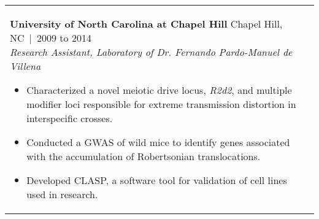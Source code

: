\documentclass[11pt,letter,sans]{moderncv}
\makeatletter
\newenvironment{entrylistFive}{%
  \begin{longtable}{@{\extracolsep{\fill}}ll}
}{%
  \end{longtable}
}
\newcommand{\entryFive}[5]{%
  \parbox[t]{170mm}{%
    \textbf{#2}%
    \hfill%
    {\footnotesize #3~|~#1}\\%
	\emph{#4}\\%
    #5\vspace{\parsep}%
  }\\}
\makeatother
\begin{document}
\begin{entrylistFive}
\entryFive
{2009 to 2014}
{University of North Carolina at Chapel Hill}
{Chapel Hill, NC}
{Research Assistant, Laboratory of Dr. Fernando Pardo-Manuel de Villena}
{\vspace{-5mm}
\begin{itemize}
\item {Characterized a novel meiotic drive locus, \textit{R2d2}, and multiple modifier loci responsible for extreme transmission distortion in interspecific crosses.}
\item {Conducted a GWAS of wild mice to identify genes associated with the accumulation of Robertsonian translocations.}
\item {Developed CLASP, a software tool for validation of cell lines used in research.}
\end{itemize}
}
\entryFive
{2007 to 2008}
{Institute for Systems Biology}
{Seattle, WA}
{Computational Biology Software Engineer, Laboratory of Dr. Ruedi Aebersold}
{\vspace{-5mm}
\begin{itemize}
\item {Created TIQAM, a work flow management system to support Multiple Reaction Monitoring (MRM) proteomics experiments.}
\end{itemize}
}
\entryFive
{2004 to 2007}
{Muze, Inc.}
{Seattle, WA}
{Software Development Engineer}
{\vspace{-5mm}
\begin{itemize}
\item {Implemented key components of web services platform for purchase and distribution of digital media, including consumer management and security.}
\item {Created an intelligent installation system that decreased deployment time for the web services platform from days to less than an hour.}
\item {Improved team efficiency by implementing a code generation framework that produced a large percentage of the domain and persistence code for the web services platform.}
\end{itemize}
}
\entryFive
{2003 to 2004}
{Encyclopaedia Britannica, Online Services}
{Chicago, IL}
{Software Developer}
{\vspace{-5mm}
\begin{itemize}
\item {Developed and tested releases of several new web products, including Spanish- and Chinese- language editions of the company's flagship product.}
\item {Elimiated substantial software licensing costs by migrating marketing and e-commerce systems from outsourced to internal solutions.}

\end{itemize}}
\end{entrylistFive}
\end{document}
